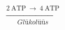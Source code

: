 \documentclass[preview]{standalone}
\begin{document}
\begin{align*}
\xrightarrow[Glükolüüs]{2\:\text{ATP}\:\rightarrow\:4\:\text{ATP}}
\end{align*}
\end{document}
